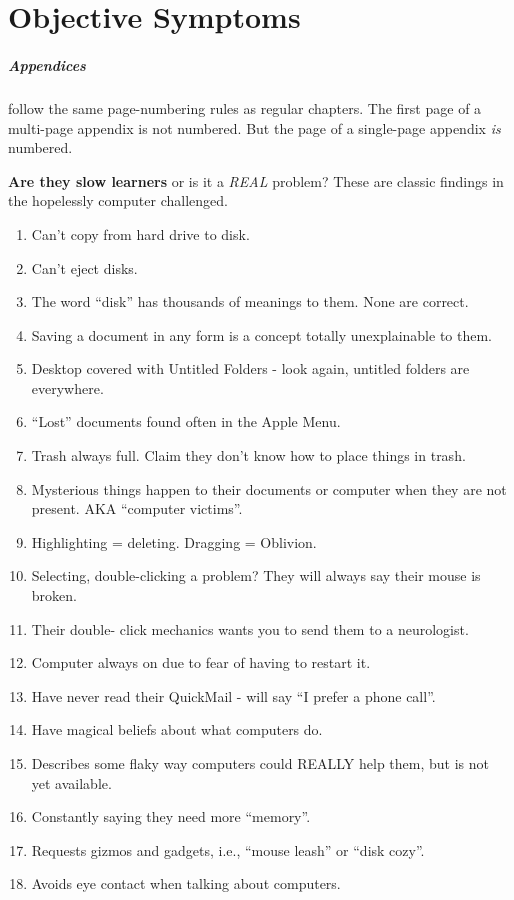 \chapter{Objective Symptoms}

\paragraph{Appendices} follow the same page-numbering rules
	as regular chapters.
	The first page of a multi-page appendix is not numbered.
	But the page of a single-page appendix {\em is} numbered.

\textbf{Are they slow learners} or is it a \emph{REAL} problem?
These are classic findings in the hopelessly computer challenged.

\begin{enumerate}

\item  Can't copy from hard drive to disk.
\item  Can't eject disks.
\item  The word ``disk'' has thousands of meanings to them. None are correct.
\item  Saving a document in any form is a concept totally unexplainable to them.
\item  Desktop covered with Untitled Folders - look again,
		untitled folders are everywhere.
\item  ``Lost'' documents found often in the Apple Menu.
\item  Trash always full. Claim they don't know how to place things in trash.
\item  Mysterious things happen to their documents or computer
	when they are not present.  AKA ``computer victims''.
\item  Highlighting = deleting. Dragging = Oblivion.
\item  Selecting, double-clicking a problem?
		They will always say their mouse is broken.
\item  Their double- click mechanics wants you to send them to a neurologist.
\item  Computer always on due to fear of having to restart it.
\item  Have never read their QuickMail - will say ``I prefer a phone call''.
\item  Have magical beliefs about what computers do.
\item  Describes some flaky way computers could REALLY help them,
		but is not yet available.
\item  Constantly saying they need more ``memory''.
\item  Requests gizmos and gadgets, i.e., ``mouse leash'' or ``disk cozy''.
\item  Avoids eye contact when talking about computers.

\end{enumerate}
